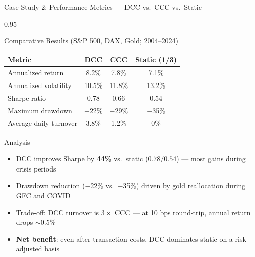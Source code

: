 \documentclass[9pt, aspectratio=169, t]{beamer}
\begin{document}
\begin{frame}{Case Study 2: Performance Metrics --- DCC vs.\ CCC vs.\ Static}
    \begin{cminipage}{0.95\textwidth}
    {\footnotesize
    \begin{block}{Comparative Results (S\&P 500, DAX, Gold; 2004--2024)}
        \vspace{0.1cm}
        {\small
        \begin{center}
        \begin{tabular}{l|ccc}
            \hline
            \textbf{Metric} & \textbf{DCC} & \textbf{CCC} & \textbf{Static (1/3)} \\
            \hline
            Annualized return    & 8.2\% & 7.8\% & 7.1\% \\
            Annualized volatility & 10.5\% & 11.8\% & 13.2\% \\
            Sharpe ratio         & 0.78 & 0.66 & 0.54 \\
            Maximum drawdown     & $-$22\% & $-$29\% & $-$35\% \\
            Average daily turnover & 3.8\% & 1.2\% & 0\% \\
            \hline
        \end{tabular}
        \end{center}
        }
    \end{block}
    \begin{alertblock}{Analysis}
        \begin{itemize}\setlength{\itemsep}{0pt}
            \item DCC improves Sharpe by \textbf{44\%} vs.\ static ($0.78/0.54$) --- most gains during crisis periods
            \item Drawdown reduction ($-$22\% vs.\ $-$35\%) driven by gold reallocation during GFC and COVID
            \item Trade-off: DCC turnover is $3\times$ CCC --- at 10 bps round-trip, annual return drops $\sim$0.5\%
            \item \textbf{Net benefit}: even after transaction costs, DCC dominates static on a risk-adjusted basis
        \end{itemize}
    \end{alertblock}
    }
    \end{cminipage}
\end{frame}
\end{document}
